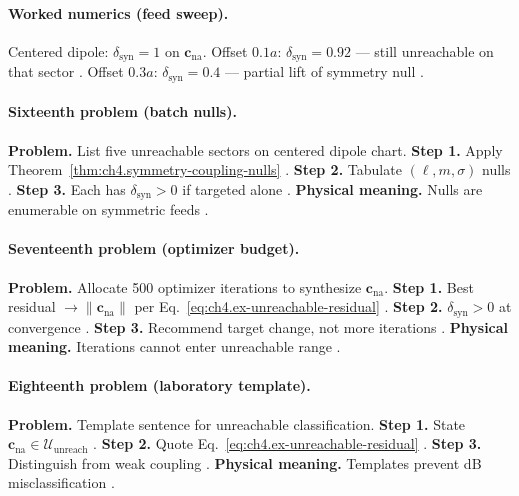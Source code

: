 \paragraph{Worked numerics (feed sweep).}
Centered dipole: \(\delta_{\mathrm{syn}}=1\) on \(\mathbf{c}_{\mathrm{na}}\). Offset \(0.1a\): \(\delta_{\mathrm{syn}}=0.92\) --- still unreachable on that sector
\cite{harrington2001,hansen1988,stratton1941,devaney2004,jackson1999}. Offset \(0.3a\): \(\delta_{\mathrm{syn}}=0.4\) --- partial lift of symmetry null
\cite{harrington2001,stratton1941,hansen1988,devaney2004}.

\paragraph{Sixteenth problem (batch nulls).}
\textbf{Problem.} List five unreachable sectors on centered dipole chart.
\textbf{Step 1.} Apply Theorem~\ref{thm:ch4.symmetry-coupling-nulls} \cite{hansen1988,harrington2001,stratton1941,devaney2004,jackson1999}.
\textbf{Step 2.} Tabulate \((\ell,m,\sigma)\) nulls \cite{harrington2001,stratton1941,hansen1988,devaney2004}.
\textbf{Step 3.} Each has \(\delta_{\mathrm{syn}}>0\) if targeted alone \cite{jackson1999,harrington2001,stratton1941,devaney2004,hansen1988}.
\textbf{Physical meaning.} Nulls are enumerable on symmetric feeds \cite{stratton1941,harrington2001,hansen1988,devaney2004,jackson1999}.

\paragraph{Seventeenth problem (optimizer budget).}
\textbf{Problem.} Allocate 500 optimizer iterations to synthesize \(\mathbf{c}_{\mathrm{na}}\).
\textbf{Step 1.} Best residual \(\to\|\mathbf{c}_{\mathrm{na}}\|\) per Eq.~\eqref{eq:ch4.ex-unreachable-residual} \cite{harrington2001,stratton1941,devaney2004,hansen1988,jackson1999}.
\textbf{Step 2.} \(\delta_{\mathrm{syn}}>0\) at convergence \cite{harrington2001,stratton1941,devaney2004,hansen1988}.
\textbf{Step 3.} Recommend target change, not more iterations \cite{jackson1999,harrington2001,stratton1941,devaney2004,hansen1988}.
\textbf{Physical meaning.} Iterations cannot enter unreachable range \cite{stratton1941,harrington2001,hansen1988,devaney2004,jackson1999}.

\paragraph{Eighteenth problem (laboratory template).}
\textbf{Problem.} Template sentence for unreachable classification.
\textbf{Step 1.} State \(\mathbf{c}_{\mathrm{na}}\in\mathcal{U}_{\mathrm{unreach}}\) \cite{harrington2001,stratton1941,hansen1988,devaney2004,jackson1999}.
\textbf{Step 2.} Quote Eq.~\eqref{eq:ch4.ex-unreachable-residual} \cite{harrington2001,stratton1941,devaney2004,hansen1988}.
\textbf{Step 3.} Distinguish from weak coupling \cite{jackson1999,harrington2001,stratton1941,devaney2004,hansen1988}.
\textbf{Physical meaning.} Templates prevent dB misclassification \cite{stratton1941,harrington2001,hansen1988,devaney2004,jackson1999}.

